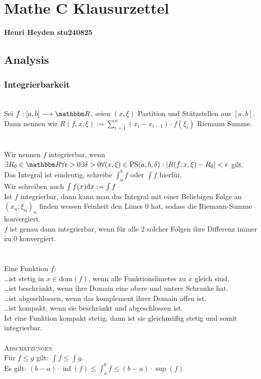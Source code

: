
\usepackage[ngerman]{babel} 


\section*{Mathe C Klausurzettel}
\textbf{Henri Heyden \gedanke stu240825}
\subsection*{Analysis}
\subsubsection*{Integrierbarkeit}
\\
Sei \(f : [a,b] \longrightarrow \R\), seien \((x, \xi)\) Partition und Stützstellen aus \([a,b]\).\\
Dann nennen wir \(R(f,x,\xi) := \sum_{i=1}^n (x_i - x_{i-1}) \cdot f(\xi_i)\) Riemann Summe. \\ \\
\\
Wir nennen \(f\) integrierbar, wenn\\\(\exists R_0 \in \R \forall \epsilon > 0 \exists \delta > 0 \forall(x,\xi) \in \text{PS}(a,b,\delta): |R(f,x,\xi) - R_0| < \epsilon\) gilt. \\
Das Integral ist eindeutig, schreibe \(\int_{a}^{b} f\) oder \(\int f\) hierfür. \\
Wir schreiben auch \(\int f(x)\text dx := \int f\) \\
Ist \(f\) integrierbar, dann kann man das Integral mit einer Beliebigen Folge an \((x_n,\xi_n)_n\) finden wessen Feinheit den Limes 0 hat, sodass die Riemann-Summe konvergiert. \\
\(f\) ist genau dann integrierbar, wenn für alle 2 solcher Folgen ihre Differenz immer zu 0 konvergiert. \\ \\
 \\
Eine Funktion \(f\): \\
\dots ist stetig in \(x \in \text{dom}(f)\), wenn alle Funktionslimetes zu \(x\) gleich sind.\\
\dots ist beschränkt, wenn ihre Domain eine obere und untere Schranke hat. \\
\dots ist abgeschlossen, wenn das komplement ihrer Domain offen ist. \\
\dots ist kompakt, wenn sie beschränkt und abgeschlossen ist. \\
Ist eine Funktion kompakt stetig, dann ist sie gleichmäßig stetig und somit integrierbar. \\ \\
\textsc{Abschätzungen} \\
Für \(f \le g\) gilt: \(\int f \le \int g\). \\
Es gilt: \((b-a) \cdot \inf(f) \le \int_{a}^{b}f \le (b-a) \cdot \sup(f)\)
